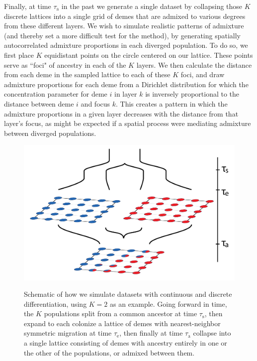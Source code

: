 \documentclass[10pt,letterpaper]{article}
\begin{document}
Finally, at time $\tau_{\text{a}}$ in the past 
we generate a single dataset 
by collapsing those $K$ discrete lattices into a single grid of demes 
that are admixed to various degrees from these different layers. 
We wish to simulate realistic patterns of admixture 
(and thereby set a more difficult test for the method), 
by generating spatially autocorrelated admixture proportions 
in each diverged population.
To do so, we first place $K$ equidistant points on the circle centered on our lattice.  
These points serve as ``foci" of ancestry in each of the $K$ layers.  
We then calculate the distance from each deme in the sampled lattice to each of these $K$ foci, 
and draw admixture proportions for each deme 
from a Dirichlet distribution for which the concentration parameter 
for deme $i$ in layer $k$ is inversely proportional to the distance between deme $i$ and focus $k$. 
This creates a pattern in which the admixture proportions in a given layer decreases 
with the distance from that layer's focus, 
as might be expected if a spatial process were mediating admixture between diverged populations.

\begin{figure}
	\centering
		{\includegraphics[width=\textwidth]{figs/sims/sim_setup.png}}
		\caption{Schematic of how we simulate datasets with continuous and discrete differentiation, using $K=2$ as an example.  
			    Going forward in time, the $K$ populations split from a common ancestor at time $\tau_{\text{s}}$,
			    then expand to each  colonize a lattice of demes with nearest-neighbor symmetric migration at time $\tau_{\text{e}}$,
			    then finally at time $\tau_{\text{a}}$ collapse into a single lattice consisting of demes 
			    with ancestry entirely in one or the other of the populations,
			    or admixed between them.
			    }\label{sim_setup}
\end{figure}
\end{document}
